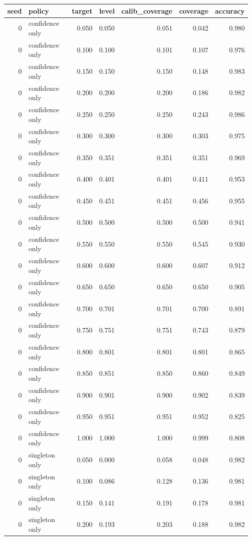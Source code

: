\begin{tabular}{rlrrrrr}
\toprule
seed & policy & target & level & calib_coverage & coverage & accuracy \\
\midrule
0 & confidence only & 0.050 & 0.050 & 0.051 & 0.042 & 0.980 \\
0 & confidence only & 0.100 & 0.100 & 0.101 & 0.107 & 0.976 \\
0 & confidence only & 0.150 & 0.150 & 0.150 & 0.148 & 0.983 \\
0 & confidence only & 0.200 & 0.200 & 0.200 & 0.186 & 0.982 \\
0 & confidence only & 0.250 & 0.250 & 0.250 & 0.243 & 0.986 \\
0 & confidence only & 0.300 & 0.300 & 0.300 & 0.303 & 0.975 \\
0 & confidence only & 0.350 & 0.351 & 0.351 & 0.351 & 0.969 \\
0 & confidence only & 0.400 & 0.401 & 0.401 & 0.411 & 0.953 \\
0 & confidence only & 0.450 & 0.451 & 0.451 & 0.456 & 0.955 \\
0 & confidence only & 0.500 & 0.500 & 0.500 & 0.500 & 0.941 \\
0 & confidence only & 0.550 & 0.550 & 0.550 & 0.545 & 0.930 \\
0 & confidence only & 0.600 & 0.600 & 0.600 & 0.607 & 0.912 \\
0 & confidence only & 0.650 & 0.650 & 0.650 & 0.650 & 0.905 \\
0 & confidence only & 0.700 & 0.701 & 0.701 & 0.700 & 0.891 \\
0 & confidence only & 0.750 & 0.751 & 0.751 & 0.743 & 0.879 \\
0 & confidence only & 0.800 & 0.801 & 0.801 & 0.801 & 0.865 \\
0 & confidence only & 0.850 & 0.851 & 0.850 & 0.860 & 0.849 \\
0 & confidence only & 0.900 & 0.901 & 0.900 & 0.902 & 0.839 \\
0 & confidence only & 0.950 & 0.951 & 0.951 & 0.952 & 0.825 \\
0 & confidence only & 1.000 & 1.000 & 1.000 & 0.999 & 0.808 \\
0 & singleton only & 0.050 & 0.000 & 0.058 & 0.048 & 0.982 \\
0 & singleton only & 0.100 & 0.086 & 0.128 & 0.136 & 0.981 \\
0 & singleton only & 0.150 & 0.141 & 0.191 & 0.178 & 0.981 \\
0 & singleton only & 0.200 & 0.193 & 0.203 & 0.188 & 0.982 \\

\end{tabular}
